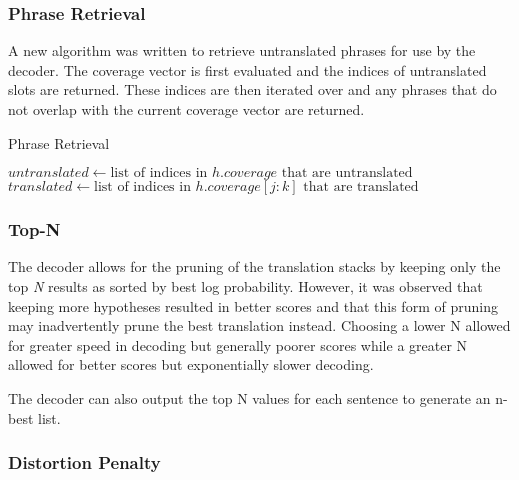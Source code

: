 \documentclass[letterpaper]{article}
\begin{document}
\subsubsection{Phrase Retrieval}

\indent \indent A new algorithm was written to retrieve untranslated phrases for use by the decoder. The coverage vector is first evaluated and the indices of untranslated slots are returned. These indices are then iterated over and any phrases that do not overlap with the current coverage vector are returned.

\begin{algorithm}
    \caption{Phrase Retrieval}\label{euclid}
    \begin{algorithmic}[1]
    \State $untranslated \gets \text{list of indices in $h.coverage$ that are untranslated}$
                \State $translated \gets \text{list of indices in $h.coverage[j:k]$ that are translated}$
                        \State {}
                    \EndIf
                \EndIf
            \EndFor
        \EndFor
    \EndFor
    \EndFunction
    \end{algorithmic}
\end{algorithm}

\subsubsection{Top-N}

\indent \indent The decoder allows for the pruning of the translation stacks by keeping only the top \textit{N} results as sorted by best log probability. However, it was observed that keeping more hypotheses resulted in better scores and that this form of pruning may inadvertently prune the best translation instead. Choosing a lower N allowed for greater speed in decoding but generally poorer scores while a greater N allowed for better scores but exponentially slower decoding.
\newline

The decoder can also output the top N values for each sentence to generate an n-best list.

\subsubsection{Distortion Penalty}
\end{document}
